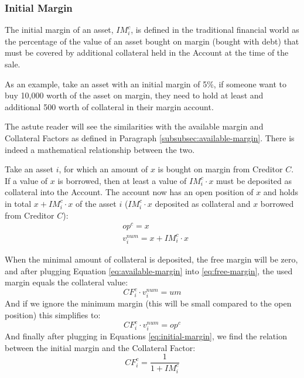 \documentclass[sigconf,nonacm]{acmart}
\begin{document}
\subsubsection{Initial Margin}
\label{subsubsec:initial-margin}
The initial margin of an asset, $IM_{i}^{c}$, is defined in the traditional financial world as the percentage of the value of an asset bought on margin (bought with debt)
that must be covered by additional collateral held in the Account at the time of the sale.

As an example, take an asset with an initial margin of 5\%, if someone want to buy 10,000 worth of the asset on margin,
they need to hold at least and additional 500 worth of collateral in their margin account.

The astute reader will see the similarities with the available margin and Collateral Factors as defined in Paragraph \ref{subsubsec:available-margin}.
There is indeed a mathematical relationship between the two.

Take an asset $i$, for which an amount of $x$ is bought on margin from Creditor $C$.
If a value of $x$ is borrowed, then at least a value of $IM_{i}^{c} \cdot x$ must be deposited as collateral into the Account.
The account now has an open position of $x$ and holds in total $x + IM_{i}^{c} \cdot x$ of the asset $i$ ($IM_{i}^{c} \cdot x$ deposited as collateral and $x$ borrowed from Creditor $C$):
\begin{equation}
    \label{eq:initial-margin}
    \begin{split}
        &op^c = x\\
        &v^{num}_i = x + IM_{i}^{c} \cdot x
    \end{split}
\end{equation}

When the minimal amount of collateral is deposited, the free margin will be zero, and after plugging Equation \ref{eq:available-margin} into \ref{eq:free-margin}, the used margin equals the collateral value:
\begin{equation}
    CF_{i}^{c} \cdot v^{num}_i = um
\end{equation}
And if we ignore the minimum margin (this will be small compared to the open position) this simplifies to:
\begin{equation}
    CF_{i}^{c} \cdot v^{num}_i = op^c
\end{equation}
And finally after plugging in Equations \ref{eq:initial-margin}, we find the relation between the initial margin and the Collateral Factor:
\begin{equation}
    CF_{i}^{c} = \frac{1}{1 + IM_{i}^{c}}
\end{equation}
\end{document}
